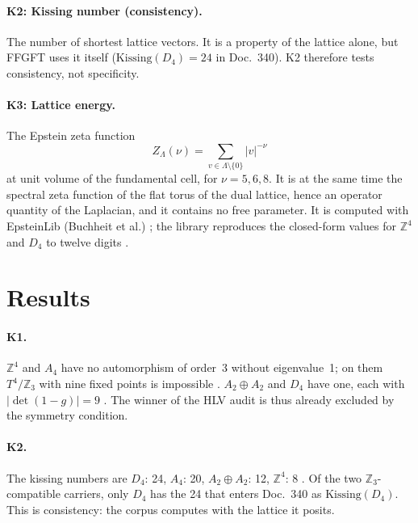 \paragraph{K2: Kissing number (consistency).}
The number of shortest lattice vectors. It is a property of the lattice alone,
but FFGFT uses it itself ($\mathrm{Kissing}(D_4)=24$ in Doc.~340). K2 therefore
tests consistency, not specificity.

\paragraph{K3: Lattice energy.}
The Epstein zeta function
\begin{equation}
Z_\Lambda(\nu)=\sum_{v\in\Lambda\setminus\{0\}}|v|^{-\nu}
\end{equation}
at unit volume of the fundamental cell, for $\nu=5,6,8$. It is at the same
time the spectral zeta function of the flat torus of the dual lattice, hence
an operator quantity of the Laplacian, and it contains no free parameter. It
is computed with EpsteinLib (Buchheit et al.) \QM; the library reproduces the
closed-form values for $\mathbb{Z}^4$ and $D_4$ to twelve digits \KM.

\section{Results}

\paragraph{K1.}
$\mathbb{Z}^4$ and $A_4$ have no automorphism of order~3 without eigenvalue~1;
on them $T^4/\mathbb{Z}_3$ with nine fixed points is impossible \KM. $A_2\oplus A_2$
and $D_4$ have one, each with $|\det(1-g)|=9$ \KM. The winner of the HLV audit
is thus already excluded by the symmetry condition.

\paragraph{K2.}
The kissing numbers are $D_4$: 24, $A_4$: 20, $A_2\oplus A_2$: 12,
$\mathbb{Z}^4$: 8 \KM. Of the two $\mathbb{Z}_3$-compatible carriers, only $D_4$
has the 24 that enters Doc.~340 as $\mathrm{Kissing}(D_4)$. This is
consistency: the corpus computes with the lattice it posits.

